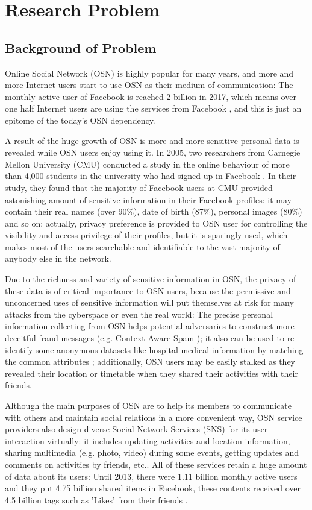 \chapter{Research Problem}
\section{Background of Problem}
Online Social Network (OSN) is highly popular for many years, and more and more Internet users start to use OSN as their medium of communication: The monthly active user of Facebook is reached 2 billion in 2017, which means over one half Internet users are using the services from Facebook \cite{statista2017facebook, itstat2017population}, and this is just an epitome of the today's OSN dependency.

A result of the huge growth of OSN is more and more sensitive personal data is revealed while OSN users enjoy using it. In 2005, two researchers from Carnegie Mellon University (CMU) conducted a study in the online behaviour of more than 4,000 students in the university who had signed up in Facebook \cite{gross2005information}. In their study, they found that the majority of Facebook users at CMU provided astonishing amount of sensitive information in their Facebook profiles: it may contain their real names (over $90\%$), date of birth ($87\%$), personal images ($80\%$) and so on; actually, privacy preference is provided to OSN user for controlling the visibility and access privilege of their profiles, but it is sparingly used, which makes most of the users searchable and identifiable to the vast majority of anybody else in the network. 

Due to the richness and variety of sensitive information in OSN, the privacy of these data is of critical importance to OSN users, because the permissive and unconcerned uses of sensitive information will put themselves at risk for many attacks from the cyberspace or even the real world: The precise personal information collecting from OSN helps potential adversaries to construct more deceitful fraud messages (e.g. Context-Aware Spam \cite{brown2008social}); it also can be used to re-identify some anonymous datasets like hospital medical information by matching the common attributes \cite{sweeney2002k}; additionally, OSN users may be easily stalked as they revealed their location or timetable when they shared their activities with their friends.

Although the main purposes of OSN are to help its members to communicate with others and maintain social relations in a more convenient way, OSN service providers also design diverse Social Network Services (SNS) for its user interaction virtually: it includes updating activities and location information, sharing multimedia (e.g. photo, video) during some events, getting updates and comments on activities by friends, etc.. All of these services retain a huge amount of data about its users: Until 2013, there were 1.11 billion monthly active users and they put 4.75 billion shared items in Facebook, these contents received over 4.5 billion tags such as 'Likes' from their friends \cite{facebook2013growth}. 

